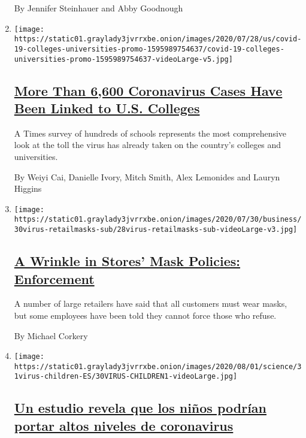 \begin{enumerate}
  By Jennifer Steinhauer and Abby Goodnough
\item
  \texttt{[image: https://static01.graylady3jvrrxbe.onion/images/2020/07/28/us/covid-19-colleges-universities-promo-1595989754637/covid-19-colleges-universities-promo-1595989754637-videoLarge-v5.jpg]}

  \hypertarget{more-than-6600-coronavirus-cases-have-been-linked-to-us-colleges}{%
  \subsection{\texorpdfstring{\href{/interactive/2020/07/28/us/covid-19-colleges-universities.html}{More
  Than 6,600 Coronavirus Cases Have Been Linked to U.S.
  Colleges}}{More Than 6,600 Coronavirus Cases Have Been Linked to U.S. Colleges}}\label{more-than-6600-coronavirus-cases-have-been-linked-to-us-colleges}}

  A Times survey of hundreds of schools represents the most
  comprehensive look at the toll the virus has already taken on the
  country's colleges and universities.

  By Weiyi Cai, Danielle Ivory, Mitch Smith, Alex Lemonides and Lauryn
  Higgins
\item
  \texttt{[image: https://static01.graylady3jvrrxbe.onion/images/2020/07/30/business/30virus-retailmasks-sub/28virus-retailmasks-sub-videoLarge-v3.jpg]}

  \hypertarget{a-wrinkle-in-stores-mask-policies-enforcement}{%
  \subsection{\texorpdfstring{\href{/2020/07/29/business/coronavirus-masks-stores-walmart.html}{A
  Wrinkle in Stores' Mask Policies:
  Enforcement}}{A Wrinkle in Stores' Mask Policies: Enforcement}}\label{a-wrinkle-in-stores-mask-policies-enforcement}}

  A number of large retailers have said that all customers must wear
  masks, but some employees have been told they cannot force those who
  refuse.

  By Michael Corkery
\item
  \texttt{[image: https://static01.graylady3jvrrxbe.onion/images/2020/08/01/science/31virus-children-ES/30VIRUS-CHILDREN1-videoLarge.jpg]}

  \hypertarget{un-estudio-revela-que-los-niuxf1os-podruxedan-portar-altos-niveles-de-coronavirus}{%
  \subsection{\texorpdfstring{\href{/es/2020/07/31/espanol/ciencia-y-tecnologia/ninos-contagio-coronavirus.html}{Un
  estudio revela que los niños podrían portar altos niveles de
  coronavirus}}{Un estudio revela que los niños podrían portar altos niveles de coronavirus}}\label{un-estudio-revela-que-los-niuxf1os-podruxedan-portar-altos-niveles-de-coronavirus}}


\end{enumerate}

